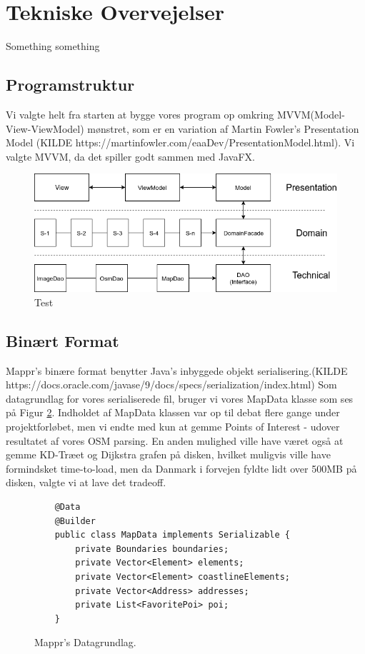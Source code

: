 \section{Tekniske Overvejelser}
Something something

\subsection{Programstruktur}
Vi valgte helt fra starten at bygge vores program op omkring MVVM(Model-View-ViewModel) mønstret, som er en variation af Martin Fowler's Presentation Model (KILDE https://martinfowler.com/eaaDev/PresentationModel.html). Vi valgte MVVM, da det spiller godt sammen med JavaFX.

\begin{figure}[h!]
	\centerline{\includegraphics[width=13 cm]{Figurer/structure.png}}
	\caption{Test}
	\label{fig:structure}
\end{figure}

\subsection{Binært Format}
Mappr's binære format benytter Java's inbyggede objekt serialisering.(KILDE https://docs.oracle.com/javase/9/docs/specs/serialization/index.html)
Som datagrundlag for vores serialiserede fil, bruger vi vores MapData klasse som ses på Figur \ref{fig:mapdata}. Indholdet af MapData klassen var op til debat flere gange under projektforløbet, men vi endte med kun at gemme Points of Interest - udover resultatet af vores OSM parsing.
En anden mulighed ville have været også at gemme KD-Træet og Dijkstra grafen på disken, hvilket muligvis ville have formindsket time-to-load, men da Danmark i forvejen fyldte lidt over 500MB på disken, valgte vi at lave det tradeoff.

\begin{figure}[h!]
    \begin{lstlisting}
	@Data
	@Builder
	public class MapData implements Serializable {
		private Boundaries boundaries;
		private Vector<Element> elements;
		private Vector<Element> coastlineElements;
		private Vector<Address> addresses;
		private List<FavoritePoi> poi;
	}
    \end{lstlisting}
    \caption{Mappr's Datagrundlag.}
    \label{fig:mapdata}
\end{figure}